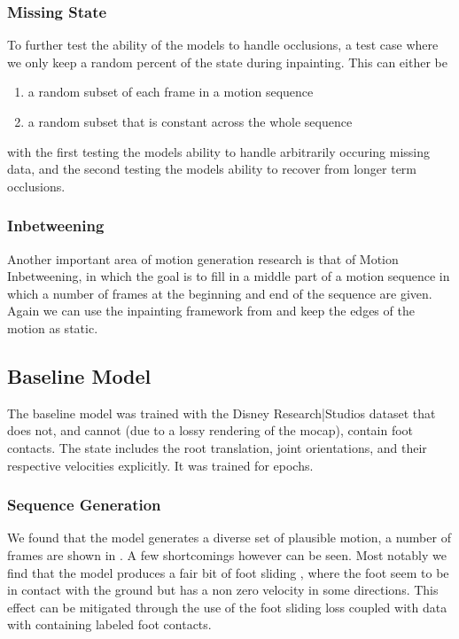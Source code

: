 \subsubsection{Missing State}
To further test the ability of the models to handle occlusions, a test case where we only keep a random percent of the state during inpainting. This can either be 
\begin{enumerate}
    \item a random subset of each frame in a motion sequence
    \item a random subset that is constant across the whole sequence
\end{enumerate}
with the first testing the models ability to handle arbitrarily occuring missing data, and the second testing the models ability to recover from longer term occlusions.

\subsubsection{Inbetweening}
Another important area of motion generation research is that of Motion Inbetweening, in which the goal is to fill in a middle part of a motion sequence in which a number of frames at the beginning and end of the sequence are given. Again we can use the inpainting framework from  and keep the edges of the motion as static.


\subsection{Baseline Model}
\label{sec:baseline_evaluation}
The baseline model was trained with the Disney Research|Studios dataset that does not, and cannot (due to a lossy rendering of the mocap), contain foot contacts. The state includes the root translation, joint orientations, and their respective velocities explicitly. It was trained for  epochs. 

\subsubsection{Sequence Generation}
We found that the model generates a diverse set of plausible motion, a number of frames are shown in . A few shortcomings however can be seen. Most notably we find that the model produces a fair bit of foot sliding , where the foot seem to be in contact with the ground but has a non zero velocity in some directions. This effect can be mitigated through the use of the foot sliding loss coupled with data with containing labeled foot contacts.

